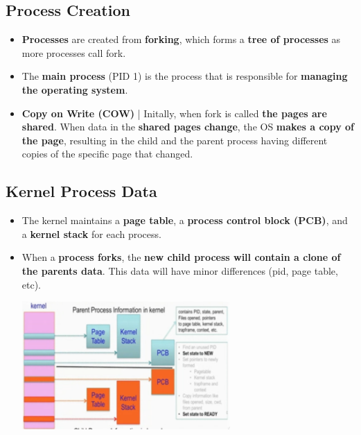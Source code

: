 \documentclass{article}
\begin{document}
    \subsection*{Process Creation}
    \begin{itemize}
        \item \textbf{Processes} are created from \textbf{forking}, which forms a \textbf{tree of processes} as more processes call fork.
        \item The \textbf{main process} (PID 1) is the process that is responsible for \textbf{managing the operating system}.
        \item \textbf{Copy on Write (COW)} | Initally, when fork is called \textbf{the pages are shared}. When data in the \textbf{shared pages change}, the OS \textbf{makes a copy of the page}, resulting in the child and the parent process having different copies of the specific page that changed.
    \end{itemize}

    \subsection*{Kernel Process Data}
    \begin{itemize}
        \item The kernel maintains a \textbf{page table}, a \textbf{process control block (PCB)}, and a \textbf{kernel stack} for each process.
        \item When a \textbf{process forks}, the \textbf{new child process will contain a clone of the parents data}. This data will have minor differences (pid, page table, etc).
        \begin{center}
            \includegraphics[width=300px]{images/Fork.png}
        \end{center}
    \end{itemize}
\end{document}
